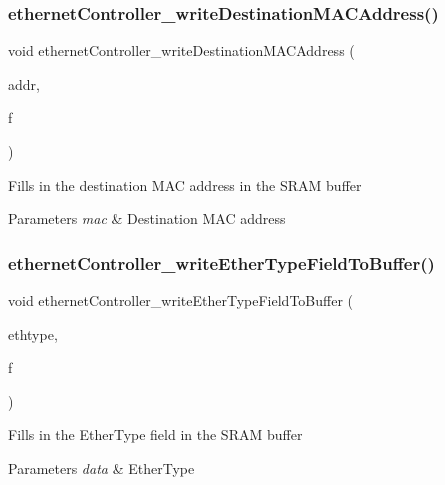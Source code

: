 \subsubsection{\texorpdfstring{ethernetController\_writeDestinationMACAddress()}{ethernetController\_writeDestinationMACAddress()}}
{\footnotesize\ttfamily void ethernet\+Controller\+\_\+write\+Destination\+M\+A\+C\+Address (\begin{DoxyParamCaption}\item[{\mbox{\hyperlink{group__ethernet_gacb865bcbf50a6c8cef05581bfabff373}{macaddress\+\_\+t}}}]{addr,  }\item[{\mbox{\hyperlink{group__memory_ga1d04d80fae40964f55d2df46b5d64785}{memory\+Field\+\_\+t}}}]{f }\end{DoxyParamCaption})}

Fills in the destination M\+AC address in the S\+R\+AM buffer 
\begin{DoxyParams}{Parameters}
{\em mac} & Destination M\+AC address \\
\hline
\end{DoxyParams}
\mbox{\label{group__data__transmission_ga8fa7a1c372901218a6c545df21fc9ef3}} 
\subsubsection{\texorpdfstring{ethernetController\_writeEtherTypeFieldToBuffer()}{ethernetController\_writeEtherTypeFieldToBuffer()}}
{\footnotesize\ttfamily void ethernet\+Controller\+\_\+write\+Ether\+Type\+Field\+To\+Buffer (\begin{DoxyParamCaption}\item[{\mbox{\hyperlink{group__ethernet_ga467703afefdcaf7893a7da3eb63280ed}{ether\+Type\+\_\+t}}}]{ethtype,  }\item[{\mbox{\hyperlink{group__memory_ga1d04d80fae40964f55d2df46b5d64785}{memory\+Field\+\_\+t}}}]{f }\end{DoxyParamCaption})}

Fills in the Ether\+Type field in the S\+R\+AM buffer 
\begin{DoxyParams}{Parameters}
{\em data} & Ether\+Type \\
\hline
\end{DoxyParams}
